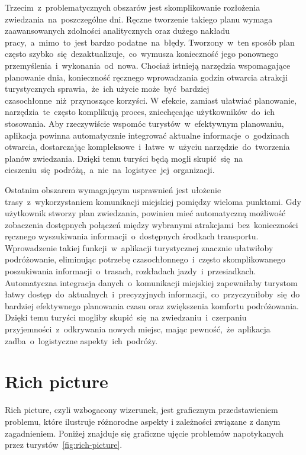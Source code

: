 Trzecim~z~problematycznych obszarów jest skomplikowanie rozłożenia zwiedzania~na~poszczególne dni.
Ręczne tworzenie takiego planu wymaga zaawansowanych zdolności analitycznych oraz dużego nakładu pracy,~a~mimo~to~jest bardzo podatne~na~błędy.
Tworzony~w~ten sposób plan często szybko~się~dezaktualizuje,~co~wymusza konieczność jego ponownego przemyślenia~i~wykonania~od~nowa.
Chociaż istnieją narzędzia wspomagające planowanie dnia, konieczność ręcznego wprowadzania godzin otwarcia atrakcji turystycznych sprawia,~że~ich użycie może~być~bardziej czasochłonne~niż~przynoszące korzyści.
W efekcie, zamiast ułatwiać planowanie, narzędzia~te~często komplikują proces, zniechęcając użytkowników~do~ich stosowania.
Aby rzeczywiście wspomóc turystów~w~efektywnym planowaniu, aplikacja powinna automatycznie integrować aktualne informacje~o~godzinach otwarcia, dostarczając kompleksowe~i~łatwe~w~użyciu narzędzie~do~tworzenia planów zwiedzania.
Dzięki temu turyści będą mogli skupić~się~na cieszeniu~się~podróżą,~a~nie~na~logistyce~jej~organizacji.

Ostatnim obszarem wymagającym usprawnień jest ułożenie trasy~z~wykorzystaniem komunikacji miejskiej pomiędzy wieloma punktami.
Gdy użytkownik stworzy plan zwiedzania, powinien mieć automatyczną możliwość zobaczenia dostępnych połączeń między wybranymi atrakcjami~bez~konieczności ręcznego wyszukiwania informacji~o~dostępnych środkach transportu.
Wprowadzenie takiej funkcji~w~aplikacji turystycznej znacznie ułatwiłoby podróżowanie, eliminując potrzebę czasochłonnego~i~często skomplikowanego poszukiwania informacji~o~trasach, rozkładach jazdy~i~przesiadkach.
Automatyczna integracja danych~o~komunikacji miejskiej zapewniłaby turystom łatwy dostęp~do~aktualnych~i~precyzyjnych informacji,~co~przyczyniłoby~się~do bardziej efektywnego planowania czasu oraz zwiększenia komfortu podróżowania.
Dzięki temu turyści mogliby skupić~się~na zwiedzaniu~i~czerpaniu przyjemności~z~odkrywania nowych miejsc, mając pewność,~że~aplikacja zadba~o~logistyczne aspekty~ich~podróży.

\section{Rich picture}
\label{sec:rich-picture}

Rich picture, czyli wzbogacony wizerunek, jest graficznym przedstawieniem problemu, które ilustruje różnorodne aspekty i zależności związane z danym zagadnieniem.
Poniżej znajduje się graficzne ujęcie problemów napotykanych przez turystów~\ref{fig:rich-picture}.

